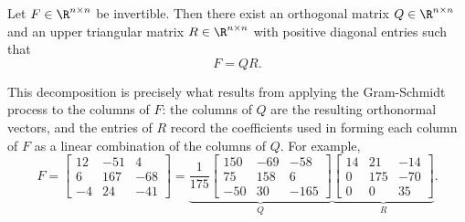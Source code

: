 \begin{definition}[QR decomposition]
    Let $F \in \R^{n \times n}$ be invertible. Then there exist an orthogonal matrix $Q \in \R^{n \times n}$ and an upper triangular matrix $R \in \R^{n \times n}$ with positive diagonal entries such that
    \begin{equation*}
        F = QR.
    \end{equation*}
\end{definition}
This decomposition is precisely what results from applying the Gram-Schmidt process to the columns of $F$: the columns of $Q$ are the resulting orthonormal vectors, and the entries of $R$ record the coefficients used in forming each column of $F$ as a linear combination of the columns of $Q$. For example,
\begin{equation*}
    F = \begin{bmatrix}
        12 & -51 & 4 \\
        6 & 167 & -68 \\
        -4 & 24 & -41
    \end{bmatrix}
    =
    \underbrace{\frac{1}{175}\begin{bmatrix}
        150 & -69 & -58 \\
        75 & 158 & 6 \\
        -50 & 30 & -165
    \end{bmatrix}}_{Q}
    \underbrace{\begin{bmatrix}
        14 & 21 & -14 \\
        0 & 175 & -70 \\
        0 & 0 & 35
    \end{bmatrix}}_{R}.
\end{equation*}

